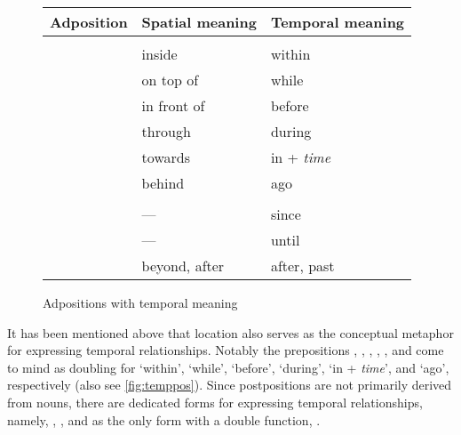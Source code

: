 \begin{figure}[tp]\centering
\caption{Adpositions with temporal meaning}
\begin{tabu} to \linewidth {X X X}
\tableheaderfont\toprule
Adposition
	& Spatial meaning
	& Temporal meaning
	\\

\toprule

\tablesubheaderfont{} \\

\midrule

	& inside
	& within
	\\

	& on top of
	& while
	\\

	& in front of
	& before
	\\

	& through
	& during
	\\

	& towards
	& in + \textit{time}
	\\

	& behind
	& ago
	\\

\midrule

\tablesubheaderfont{} \\

\midrule

	& ---
	& since
	\\

	& ---
	& until
	\\

	& beyond, after
	& after, past
	\\

\bottomrule
\end{tabu}

\label{fig:temppos}
\end{figure}

It has been mentioned above that location also serves as the conceptual
metaphor for expressing temporal relationships. Notably the prepositions
, , , , , and
 come to mind as doubling for `within', `while',
`before', `during', `in + \emph{time}', and `ago', respectively (also see
\autoref{fig:temppos}). Since postpositions are not primarily derived from
nouns, there are dedicated forms for expressing temporal relationships, namely,
,
, and as the only form with a double function,
.

